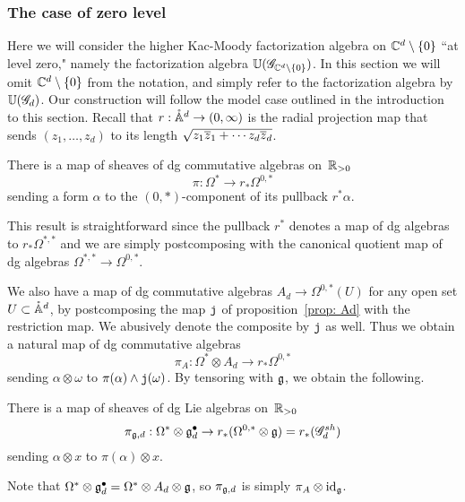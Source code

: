 \subsubsection{The case of zero level}

Here we will consider the higher Kac-Moody factorization algebra on $\mathbb C^d \setminus \{0\}$ ``at level zero," namely the factorization algebra $\mathbb U(\mathscr G_{\mathbb C^d \setminus\{0\}})$.
In this section we will omit $\mathbb C^d \setminus \{0\}$ from the notation, and simply refer to the factorization algebra by $\mathbb U(\mathscr G_d)$. 
Our construction will follow the model case outlined in the introduction to this section.
Recall that $r: \mathring{\mathbb A}^d \to (0,\infty)$ is the radial projection map that sends $(z_1,\ldots,z_d)$ to its length $\sqrt{z_1\overline{z}_1 + \cdots z_d \overline{z}_d}$.

\begin{lem}
There is a map of sheaves of dg commutative algebras on~$\mathbb R_{>0}$
\[
\pi: \Omega^* \to r_* \Omega^{0,*}
\]
sending a form $\alpha$ to the $(0,*)$-component of its pullback $r^*\alpha$.
\end{lem}

This result is straightforward since the pullback $r^*$ denotes a map of dg algebras to $r_* \Omega^{*,*}$ and we are simply postcomposing with the canonical quotient map of dg algebras $\Omega^{*,*} \to \Omega^{0,*}$. 

We also have a map of dg commutative algebras $A_d \to \Omega^{0,*}(U)$ for any open set $U \subset \mathring{\mathbb A}^d$,
by postcomposing the map ${\mathtt{j}}$ of proposition~\ref{prop: Ad} with the restriction map.
We abusively denote the composite by ${\mathtt{j}}$ as well.
Thus we obtain a natural map of dg commutative algebras
\[
\pi_A: \Omega^* \otimes A_d \to r_* \Omega^{0,*}
\]
sending $\alpha \otimes \omega$ to $\pi(\alpha) \wedge {\mathtt{j}}(\omega)$.
By tensoring with $\mathfrak g$, we obtain the following.

\begin{cor}
There is a map of sheaves of dg Lie algebras on~$\mathbb R_{>0}$
\[
\pi_{\mathfrak g, d}: \Omega^* \otimes \mathfrak g^\bullet_d \to r_* (\Omega^{0,*}\otimes \mathfrak g) = r_*(\mathscr G_d^{sh})
\]
sending $\alpha \otimes x$ to $\pi(\alpha) \otimes x$.
\end{cor}

Note that $\Omega^* \otimes \mathfrak g^\bullet_d = \Omega^* \otimes A_d \otimes \mathfrak g$, so $\pi_{\mathfrak g, d}$ is simply $\pi_A \otimes {\rm id}_\mathfrak g$.

